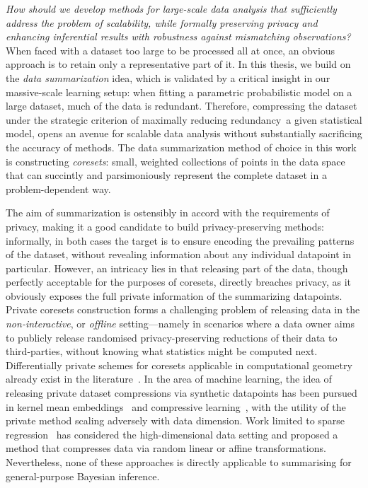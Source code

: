 \emph{How should we develop methods for large-scale data analysis that sufficiently address the problem of scalability, while formally preserving privacy and enhancing inferential results with robustness against mismatching observations?} When faced with a dataset too large to be processed all at once, an obvious approach is to retain only a representative part of it. In this thesis, we build on the \emph{data summarization} idea, which is validated by a critical insight in our massive-scale learning setup: when fitting a parametric probabilistic model on a large dataset, much of the data is redundant. Therefore, compressing the dataset under the strategic criterion of maximally reducing redundancy~\wrt a given statistical model, opens an avenue for scalable data analysis without substantially sacrificing the accuracy of methods. The data summarization method of choice in this work is constructing \emph{coresets}: small, weighted collections of points in the data space that can succintly and parsimoniously represent the complete dataset in a problem-dependent way. 

The aim of summarization is ostensibly in accord with the requirements of privacy, making it a good candidate to build privacy-preserving methods: informally, in both cases the target is to ensure encoding the prevailing patterns of the dataset, without revealing information about any individual datapoint in particular. However, an intricacy lies in that releasing part of the data, though perfectly acceptable for the purposes of coresets, directly breaches privacy, as it obviously exposes the full private information of the summarizing datapoints. Private coresets construction forms a challenging problem of releasing data in the \emph{non-interactive}, or \emph{offline} setting---namely in scenarios where a data owner aims to publicly release randomised privacy-preserving reductions of their data to third-parties, without knowing what statistics might be computed next. Differentially private schemes for coresets applicable in computational geometry already exist in the literature~\citep{feldman09,feldman17}. In the area of machine learning, the idea of releasing private dataset compressions via synthetic datapoints has been pursued in kernel mean embeddings~\citep{balog18} and compressive learning~\citep{schellekens19}, with the utility of the private method scaling adversely with data dimension. Work limited to sparse regression~\citep{zhou08} has considered the high-dimensional data setting and proposed a method that compresses data via random linear or affine transformations. Nevertheless, none of these approaches is directly applicable to summarising for general-purpose Bayesian inference. 

